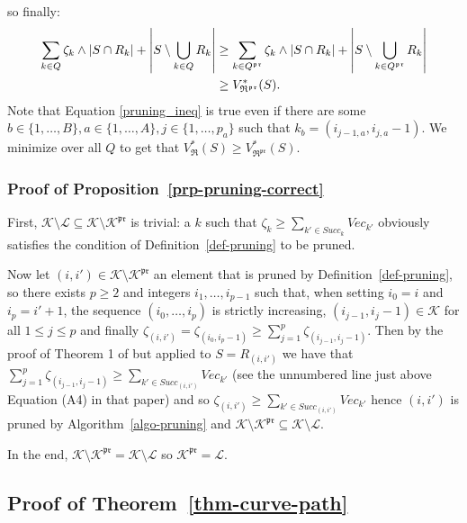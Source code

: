 \documentclass[
  11pt,
  a4paper,
]{article}
\theoremstyle{plain}
\theoremstyle{definition}
\theoremstyle{plain}
\theoremstyle{definition}
\theoremstyle{plain}
\theoremstyle{remark}
\begin{document}
so finally: \begin{align}
\sum_{k\in Q}\zeta_k\wedge|S\cap R_k|+\left| S\setminus\bigcup_{k\in Q} R_k   \right| &\geq \sum_{k\in Q^{\mathfrak{pr}}}\zeta_k\wedge|S\cap R_k|+\left| S\setminus\bigcup_{k\in Q^{\mathfrak{pr}}} R_k   \right|   \label{pruning_ineq}\\
&\geq V^*_{\mathfrak{R}^{\mathfrak{pr}}}(S). \notag
\end{align} Note that Equation \eqref{pruning_ineq} is true even if
there are some
\(b\in\{ 1,\dotsc,B\}, a\in\{ 1,\dotsc,A\}, j\in\{ 1,\dotsc,p_a\}\) such
that \(k_b=(i_{j-1,a}, i_{j,a}-1)\). We minimize over all \(Q\) to get
that
\(V^*_{\mathfrak{R}}(S)\geq V^*_{\mathfrak{R}^{\mathfrak{pr}}}(S)\).

\subsubsection{\texorpdfstring{Proof of
Proposition~\ref{prp-pruning-correct}}{Proof of Proposition~}}\label{sec-pruning-proofs-pruning-correct}

First,
\(\mathcal{K}\setminus\mathcal{L}\subseteq\mathcal{K}\setminus\mathcal{K}^{\mathfrak{pr}}\)
is trivial: a \(k\) such that
\(\zeta_{k} \geq  \sum_{k'\in Succ_k} Vec_{k'}\) obviously satisfies the
condition of Definition~\ref{def-pruning} to be pruned.

Now let \((i,i')\in \mathcal{K}\setminus\mathcal{K}^{\mathfrak{pr}}\) an
element that is pruned by Definition~\ref{def-pruning}, so there exists
\(p\geq2\) and integers \(i_1,\dotsc,i_{p-1}\) such that, when setting
\(i_0=i\) and \(i_{p}=i'+1\), the sequence \((i_0,\dotsc,i_{p})\) is
strictly increasing, \((i_{j-1},i_{j}-1)\in\mathcal{K}\) for all
\(1\leq j\leq p\) and finally
\(\zeta_{(i,i')}=\zeta_{(i_0,i_{p}-1)}\geq \sum_{j=1}^{p} \zeta_{(i_{j-1}, i_{j}-1)}\).
Then by the proof of Theorem 1 of \citet{MR4178188} but applied to
\(S=R_{(i,i')}\) we have that
\(\sum_{j=1}^{p} \zeta_{(i_{j-1}, i_{j}-1)}\geq  \sum_{k'\in Succ_{(i,i')}} Vec_{k'}\)
(see the unnumbered line just above Equation (A4) in that paper) and so
\(\zeta_{(i,i')}\geq \sum_{k'\in Succ_{(i,i')}} Vec_{k'}\) hence
\((i,i')\) is pruned by Algorithm~\ref{algo-pruning} and
\(\mathcal{K}\setminus\mathcal{K}^{\mathfrak{pr}}\subseteq\mathcal{K}\setminus\mathcal{L}\).

In the end,
\(\mathcal{K}\setminus\mathcal{K}^{\mathfrak{pr}}=\mathcal{K}\setminus\mathcal{L}\)
so \(\mathcal{K}^{\mathfrak{pr}}=\mathcal{L}\).

\subsection{\texorpdfstring{Proof of
Theorem~\ref{thm-curve-path}}{Proof of Theorem~}}\label{sec-proof}
\end{document}
